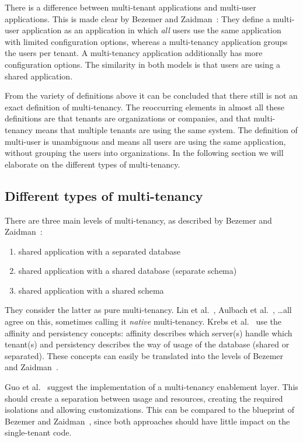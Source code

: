 There is a difference between multi-tenant applications and multi-user applications. This is made clear by Bezemer and Zaidman~\cite{bezemer2010multi}: They define a multi-user application as an application in which \emph{all} users use the same application with limited configuration options, whereas a multi-tenancy application groups the users per tenant. A multi-tenancy application additionally has more configuration options. The similarity in both models is that users are using a shared application. %

From the variety of definitions above it can be concluded that there still is not an exact definition of multi-tenancy. The reoccurring elements in almost all these definitions are that tenants are organizations or companies, and that multi-tenancy means that multiple tenants are using the same system. The definition of multi-user is unambiguous and means all users are using the same application, without grouping the users into organizations. In the following section we will elaborate on the different types of multi-tenancy. 

\subsection{Different types of multi-tenancy}

There are three main levels of multi-tenancy, as described by Bezemer and Zaidman~\cite{bezemer2010multi}:
\begin{enumerate}
\item shared application with a separated database
\item shared application with a shared database (separate schema)
\item shared application with a shared schema
\end{enumerate}
They consider the latter as pure multi-tenancy. Lin et al.~\cite{lin2009feedback}, Aulbach et al.~\cite{aulbach2009comparison}, \ldots all agree on this, sometimes calling it \emph{native} multi-tenancy. Krebs et al.~\cite{krebs2012architecture} use the affinity and persistency concepts: affinity describes which server(s) handle which tenant(s) and persistency describes the way of usage of the database (shared or separated). These concepts can easily be translated into the levels of Bezemer and Zaidman~\cite{bezemer2010multi}. 


Guo et al.~\cite{guo2007framework} suggest the implementation of a multi-tenancy enablement layer. This should create a separation between usage and resources, creating the required isolations and allowing customizations. This can be compared to the blueprint of Bezemer and Zaidman~\cite{bezemer2010multi}, since both approaches should have little impact on the single-tenant code.

